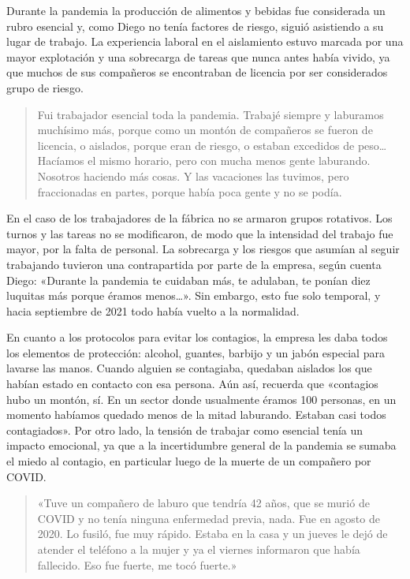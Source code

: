 Durante la pandemia la producción de alimentos y bebidas fue considerada un rubro esencial y, como Diego no tenía factores de riesgo, siguió asistiendo a su lugar de trabajo. La experiencia laboral en el aislamiento estuvo marcada por una mayor explotación y una sobrecarga de tareas que nunca antes había vivido, ya que muchos de sus compañeros se encontraban de licencia por ser considerados grupo de riesgo.

\begin{quote}
Fui trabajador esencial toda la pandemia. Trabajé siempre y laburamos muchísimo más, porque como un montón de compañeros se fueron de licencia, o aislados, porque eran de riesgo, o estaban excedidos de peso\ldots Hacíamos el mismo horario, pero con mucha menos gente laburando. Nosotros haciendo más cosas. Y las vacaciones las tuvimos, pero fraccionadas en partes, porque había poca gente y no se podía.
\end{quote}

En el caso de los trabajadores de la fábrica no se armaron grupos rotativos. Los turnos y las tareas no se modificaron, de modo que la intensidad del trabajo fue mayor, por la falta de personal. La sobrecarga y los riesgos que asumían al seguir trabajando tuvieron una contrapartida por parte de la empresa, según cuenta Diego: «Durante la pandemia te cuidaban más, te adulaban, te ponían diez luquitas más porque éramos menos\ldots». Sin embargo, esto fue solo temporal, y hacia septiembre de 2021 todo había vuelto a la normalidad.

En cuanto a los protocolos para evitar los contagios, la empresa les daba todos los elementos de protección: alcohol, guantes, barbijo y un jabón especial para lavarse las manos. Cuando alguien se contagiaba, quedaban aislados los que habían estado en contacto con esa persona. Aún así, recuerda que «contagios hubo un montón, sí. En un sector donde usualmente éramos 100 personas, en un momento habíamos quedado menos de la mitad laburando. Estaban casi todos contagiados». Por otro lado, la tensión de trabajar como esencial tenía un impacto emocional, ya que a la incertidumbre general de la pandemia se sumaba el miedo al contagio, en particular luego de la muerte de un compañero por COVID.

\begin{quote}
«Tuve un compañero de laburo que tendría 42 años, que se murió de COVID y no tenía ninguna enfermedad previa, nada. Fue en agosto de 2020. Lo fusiló, fue muy rápido. Estaba en la casa y un jueves le dejó de atender el teléfono a la mujer y ya el viernes informaron que había fallecido. Eso fue fuerte, me tocó fuerte.»
\end{quote}

